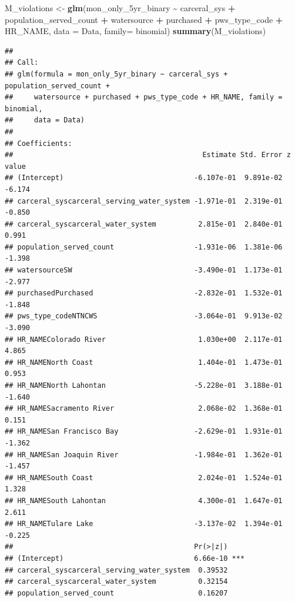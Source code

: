 \documentclass[
]{article}
\newenvironment{Shaded}{\begin{snugshade}}{\end{snugshade}}
\newcommand{\AttributeTok}[1]{\textcolor[rgb]{0.13,0.29,0.53}{#1}}
\newcommand{\FunctionTok}[1]{\textcolor[rgb]{0.13,0.29,0.53}{\textbf{#1}}}
\newcommand{\NormalTok}[1]{#1}
\newcommand{\OtherTok}[1]{\textcolor[rgb]{0.56,0.35,0.01}{#1}}
\newcommand{\SpecialCharTok}[1]{\textcolor[rgb]{0.81,0.36,0.00}{\textbf{#1}}}
\begin{document}
\begin{Shaded}
\begin{Highlighting}[]
\NormalTok{M\_violations }\OtherTok{\textless{}{-}} \FunctionTok{glm}\NormalTok{(mon\_only\_5yr\_binary }\SpecialCharTok{\textasciitilde{}}\NormalTok{ carceral\_sys }\SpecialCharTok{+}\NormalTok{ population\_served\_count }\SpecialCharTok{+}\NormalTok{ watersource }\SpecialCharTok{+}\NormalTok{ purchased }\SpecialCharTok{+}\NormalTok{ pws\_type\_code }\SpecialCharTok{+}\NormalTok{ HR\_NAME, }\AttributeTok{data =}\NormalTok{ Data, }\AttributeTok{family=}\NormalTok{ binomial)}
\FunctionTok{summary}\NormalTok{(M\_violations)}
\end{Highlighting}
\end{Shaded}

\begin{verbatim}
## 
## Call:
## glm(formula = mon_only_5yr_binary ~ carceral_sys + population_served_count + 
##     watersource + purchased + pws_type_code + HR_NAME, family = binomial, 
##     data = Data)
## 
## Coefficients:
##                                             Estimate Std. Error z value
## (Intercept)                               -6.107e-01  9.891e-02  -6.174
## carceral_syscarceral_serving_water_system -1.971e-01  2.319e-01  -0.850
## carceral_syscarceral_water_system          2.815e-01  2.840e-01   0.991
## population_served_count                   -1.931e-06  1.381e-06  -1.398
## watersourceSW                             -3.490e-01  1.173e-01  -2.977
## purchasedPurchased                        -2.832e-01  1.532e-01  -1.848
## pws_type_codeNTNCWS                       -3.064e-01  9.913e-02  -3.090
## HR_NAMEColorado River                      1.030e+00  2.117e-01   4.865
## HR_NAMENorth Coast                         1.404e-01  1.473e-01   0.953
## HR_NAMENorth Lahontan                     -5.228e-01  3.188e-01  -1.640
## HR_NAMESacramento River                    2.068e-02  1.368e-01   0.151
## HR_NAMESan Francisco Bay                  -2.629e-01  1.931e-01  -1.362
## HR_NAMESan Joaquin River                  -1.984e-01  1.362e-01  -1.457
## HR_NAMESouth Coast                         2.024e-01  1.524e-01   1.328
## HR_NAMESouth Lahontan                      4.300e-01  1.647e-01   2.611
## HR_NAMETulare Lake                        -3.137e-02  1.394e-01  -0.225
##                                           Pr(>|z|)    
## (Intercept)                               6.66e-10 ***
## carceral_syscarceral_serving_water_system  0.39532    
## carceral_syscarceral_water_system          0.32154    
## population_served_count                    0.16207    

\end{verbatim}
\end{document}
